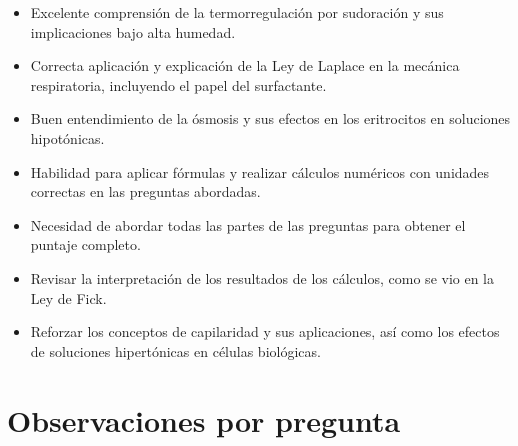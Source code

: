\documentclass[11pt,a4paper]{article}
\begin{document}
\vspace{4pt}
\begin{minipage}[t]{0.48\linewidth}
  \begin{tcolorbox}[cajaFortaleza, title={Fortalezas}]
\begin{itemize}[leftmargin=1.5em, itemsep=2pt]
  \item Excelente comprensión de la termorregulación por sudoración y sus implicaciones bajo alta humedad.
  \item Correcta aplicación y explicación de la Ley de Laplace en la mecánica respiratoria, incluyendo el papel del surfactante.
  \item Buen entendimiento de la ósmosis y sus efectos en los eritrocitos en soluciones hipotónicas.
  \item Habilidad para aplicar fórmulas y realizar cálculos numéricos con unidades correctas en las preguntas abordadas.
\end{itemize}
  \end{tcolorbox}
\end{minipage}
\hfill
\begin{minipage}[t]{0.48\linewidth}
  \begin{tcolorbox}[cajaMejora, title={Areas de mejora}]
\begin{itemize}[leftmargin=1.5em, itemsep=2pt]
  \item Necesidad de abordar todas las partes de las preguntas para obtener el puntaje completo.
  \item Revisar la interpretación de los resultados de los cálculos, como se vio en la Ley de Fick.
  \item Reforzar los conceptos de capilaridad y sus aplicaciones, así como los efectos de soluciones hipertónicas en células biológicas.
\end{itemize}
  \end{tcolorbox}
\end{minipage}

\section*{Observaciones por pregunta}
\end{document}
